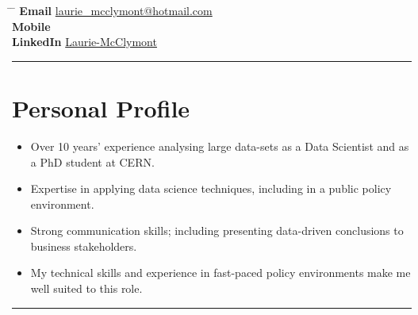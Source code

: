 \documentclass[10pt]{article} %
\begin{document}


\parbox{0.5\textwidth}{ %
\title{} %
}
\hspace{2cm} %
\parbox{0.5\textwidth}{ %
  \begin{tabbing} %
    \hspace{2cm} \= \hspace{3cm} \= \kill %
           {\bf Email} \> \href{mailto:laurie_mcclymont@hotmail.com}{laurie\_mcclymont@hotmail.com} \\ %
           {\bf Mobile}   \\ %
           {\bf LinkedIn} \> \href{https://www.linkedin.com/in/laurie-mcclymont-695520118/}{Laurie-McClymont} %
  \end{tabbing}
}

\rule{\textwidth}{0.5mm}


\vspace{-2mm}
\section{Personal Profile}
\begin{itemize}
\item{Over 10 years' experience analysing large data-sets as a Data Scientist and as a PhD student at CERN.}
\item{Expertise in applying data science techniques, including in a public policy environment.}
\item{Strong communication skills; including presenting data-driven conclusions to business stakeholders.}
\item{My technical skills and experience in fast-paced policy environments make me well suited to this role.}
\end{itemize}

\vspace{0.2mm}
\rule{\textwidth}{0.5mm}

\vspace{-2mm}
\end{document}
